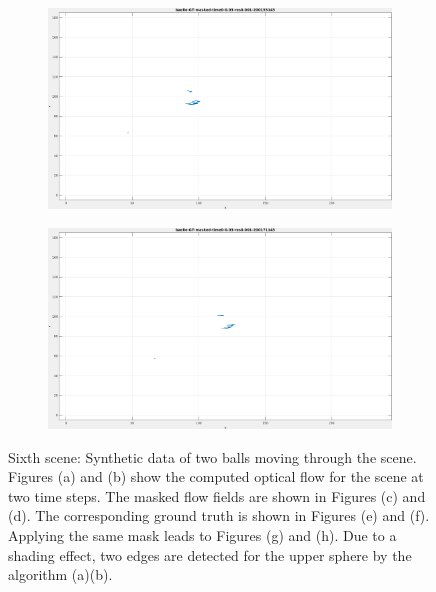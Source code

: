 \begin{appendix}
\begin{figure}[tb]
\begin{subfigure}{.45\textwidth}
  \caption{}
\end{subfigure}
\begin{subfigure}{.45\textwidth}
  \centering
  \includegraphics[height=.6\linewidth]{figs/baelle/baelle-GT-masked-1.png}
  \caption{}
\end{subfigure}
\begin{subfigure}{.45\textwidth}
  \centering
  \includegraphics[height=.6\linewidth]{figs/baelle/baelle-GT-masked-2.png}
  \caption{}
\end{subfigure}
\caption[Sixth scene: Synthetic data of two balls moving through the scene.]{Sixth scene: Synthetic data of two balls moving through the scene.
Figures (a) and (b) show the computed optical flow for the scene at two time steps. The masked flow fields are shown in Figures (c) and (d).
The corresponding ground truth is shown in Figures (e) and (f). Applying the same mask leads to Figures (g) and (h).
Due to a shading effect, two edges are detected for the upper sphere by the algorithm (a)(b).}
\label{fig:app_baelle-snapshots}
\end{figure}
	 
	 
\end{appendix}
